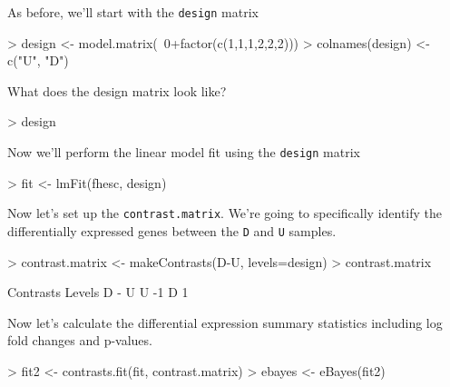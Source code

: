\documentclass[12pt]{article}
\newcommand{\code}[1]{{\texttt{#1}}}
\begin{document}
As before, we'll start with the \code{design} matrix

\begin{Schunk}
\begin{Sinput}
> design <- model.matrix(~0+factor(c(1,1,1,2,2,2)))
> colnames(design) <- c("U", "D")
\end{Sinput}
\end{Schunk}

What does the design matrix look like?

\begin{Schunk}
\begin{Sinput}
> design
\end{Sinput}
\end{Schunk}

Now we'll perform the linear model fit using the \code{design} matrix

\begin{Schunk}
\begin{Sinput}
> fit <- lmFit(fhesc, design)
\end{Sinput}
\end{Schunk}

Now let's set up the \code{contrast.matrix}.  We're going to specifically identify the differentially expressed genes between the \code{D} and \code{U} samples. 

\begin{Schunk}
\begin{Sinput}
> contrast.matrix <- makeContrasts(D-U, levels=design)
> contrast.matrix
\end{Sinput}
\begin{Soutput}
      Contrasts
Levels D - U
     U    -1
     D     1
\end{Soutput}
\end{Schunk}

Now let's calculate the differential expression summary statistics including log fold changes and p-values.

\begin{Schunk}
\begin{Sinput}
> fit2 <- contrasts.fit(fit, contrast.matrix)
> ebayes <- eBayes(fit2)
\end{Sinput}
\end{Schunk}
\end{document}
